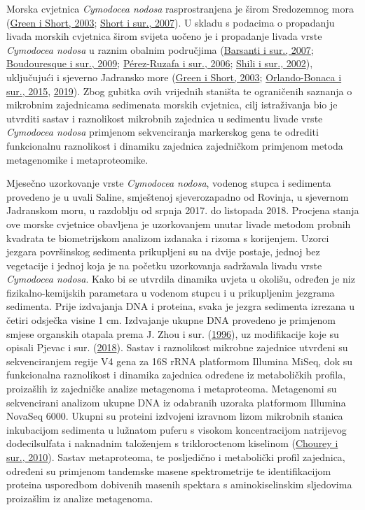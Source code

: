 \documentclass[
  12 pt,
]{book}
\begin{document}
{Morska cvjetnica \emph{Cymodocea nodosa} rasprostranjena je širom Sredozemnog mora (\protect\hyperlink{ref-Green2003}{Green i Short, 2003}; \protect\hyperlink{ref-Short2007}{Short i sur., 2007}). U skladu s podacima o propadanju livada morskih cvjetnica širom svijeta uočeno je i propadanje livada vrste \emph{Cymodocea nodosa} u raznim obalnim područjima (\protect\hyperlink{ref-Barsanti2007}{Barsanti i sur., 2007}; \protect\hyperlink{ref-Boudouresque2009}{Boudouresque i sur., 2009}; \protect\hyperlink{ref-Perez-Ruzafa2006}{Pérez-Ruzafa i sur., 2006}; \protect\hyperlink{ref-Shili2002}{Shili i sur., 2002}), uključujući i sjeverno Jadransko more (\protect\hyperlink{ref-Green2003}{Green i Short, 2003}; \protect\hyperlink{ref-Orlando-Bonaca2015}{Orlando-Bonaca i sur., 2015}, \protect\hyperlink{ref-Orlando-Bonaca2019}{2019}). Zbog gubitka ovih vrijednih staništa te ograničenih saznanja o mikrobnim zajednicama sedimenata morskih cvjetnica, cilj istraživanja bio je utvrditi sastav i raznolikost mikrobnih zajednica u sedimentu livade vrste \emph{Cymodocea nodosa} primjenom sekvenciranja markerskog gena te odrediti funkcionalnu raznolikost i dinamiku zajednica zajedničkom primjenom metoda metagenomike i metaproteomike.

Mjesečno uzorkovanje vrste \emph{Cymodocea nodosa}, vodenog stupca i sedimenta provedeno je u uvali Saline, smještenoj sjeverozapadno od Rovinja, u sjevernom Jadranskom moru, u razdoblju od srpnja 2017. do listopada 2018. Procjena stanja ove morske cvjetnice obavljena je uzorkovanjem unutar livade metodom probnih kvadrata te biometrijskom analizom izdanaka i rizoma s korijenjem. Uzorci jezgara površinskog sedimenta prikupljeni su na dvije postaje, jednoj bez vegetacije i jednoj koja je na početku uzorkovanja sadržavala livadu vrste \emph{Cymodocea nodosa}. Kako bi se utvrdila dinamika uvjeta u okolišu, određen je niz fizikalno-kemijskih parametara u vodenom stupcu i u prikupljenim jezgrama sedimenta. Prije izdvajanja DNA i proteina, svaka je jezgra sedimenta izrezana u četiri odsječka visine 1 \si{\cm}. Izdvajanje ukupne DNA provedeno je primjenom smjese organskih otapala prema J. Zhou i sur. (\protect\hyperlink{ref-Zhou1996}{1996}), uz modifikacije koje su opisali Pjevac i sur. (\protect\hyperlink{ref-Pjevac2018}{2018}). Sastav i raznolikost mikrobne zajednice utvrđeni su sekvenciranjem regije V4 gena za 16S rRNA platformom Illumina MiSeq, dok su funkcionalna raznolikost i dinamika zajednica određene iz metaboličkih profila, proizašlih iz zajedničke analize metagenoma i metaproteoma. Metagenomi su sekvencirani analizom ukupne DNA iz odabranih uzoraka platformom Illumina NovaSeq 6000. Ukupni su proteini izdvojeni izravnom lizom mikrobnih stanica inkubacijom sedimenta u lužnatom puferu s visokom koncentracijom natrijevog dodecilsulfata i naknadnim taloženjem s trikloroctenom kiselinom (\protect\hyperlink{ref-Chourey2010}{Chourey i sur., 2010}). Sastav metaproteoma, te posljedično i metabolički profil zajednica, određeni su primjenom tandemske masene spektrometrije te identifikacijom proteina usporedbom dobivenih masenih spektara s aminokiselinskim sljedovima proizašlim iz analize metagenoma.

}
\end{document}
